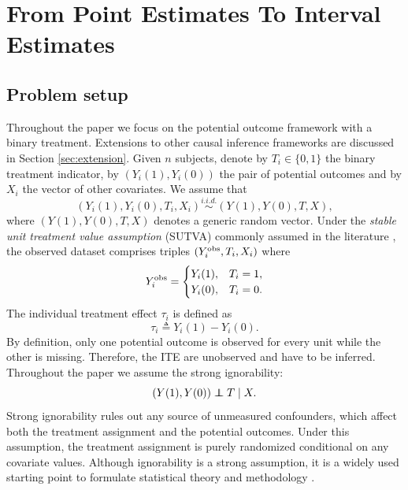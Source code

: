\section{From Point Estimates To Interval Estimates}
\label{sec:setup}
\subsection{Problem setup}
Throughout the paper we focus on the potential outcome framework
\citep{neyman1923application, rubin1974estimating} with a binary
treatment. Extensions to other causal inference frameworks are
discussed in Section \ref{sec:extension}. Given $n$ subjects, denote
by $T_{i}\in \{0, 1\}$ the binary treatment indicator, by
$(Y_{i}(1), Y_{i}(0))$ the pair of potential outcomes and by $X_{i}$
the vector of other covariates. We assume that
\[(Y_{i}(1), Y_{i}(0), T_{i}, X_{i})\stackrel{i.i.d.}{\sim}(Y(1), Y(0), T, X),\]
where $(Y(1), Y(0), T, X)$ denotes a generic random vector. Under the
{\em stable unit treatment value assumption} (SUTVA) commonly assumed
in the literature \citep{rubin1990formal}, the observed dataset comprises triples $(Y_{i}^{\mathrm{obs}}, T_{i}, X_{i})$ where
\[Y_{i}^{\mathrm{obs}} = \begin{cases} Y_{i}(1), & T_{i} = 1,\\
 Y_{i}(0), & T_i = 0.\end{cases} 
\]
The individual treatment effect $\tau_{i}$ is defined as
\begin{equation}
\label{eq:ITE}
\tau_{i} \triangleq  Y_{i}(1) - Y_{i}(0).
\end{equation}
By definition, only one potential outcome is observed for every unit while the other is missing. Therefore, the ITE are unobserved and have to be inferred. Throughout the paper we assume the strong ignorability:
\begin{equation}
  \label{eq:ignorability}
  (Y(1), Y(0)) \indep T \mid X.
\end{equation}
Strong ignorability rules out any source of unmeasured confounders,
which affect both the treatment assignment and the potential
outcomes. Under this assumption, the treatment assignment is purely
randomized conditional on any covariate values. Although ignorability
is a strong assumption, it is a widely used starting point to
formulate statistical theory and methodology \citep{rubin1978bayesian, rosenbaum1983central, imbens2015causal}. %

